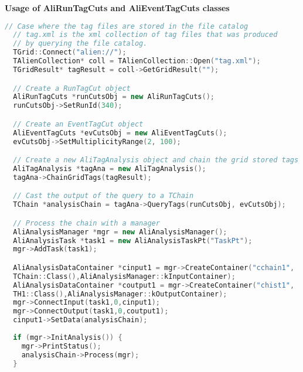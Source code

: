 \vspace{0.5 cm}
\textbf{Usage of AliRunTagCuts and AliEventTagCuts classes}
\begin{lstlisting}[language=C++]
  // Case where the tag files are stored in the file catalog
  // tag.xml is the xml collection of tag files that was produced 
  // by querying the file catalog.
  TGrid::Connect("alien://"); 
  TAlienCollection* coll = TAlienCollection::Open("tag.xml");
  TGridResult* tagResult = coll->GetGridResult("");

  // Create a RunTagCut object
  AliRunTagCuts *runCutsObj = new AliRunTagCuts();
  runCutsObj->SetRunId(340);

  // Create an EventTagCut object
  AliEventTagCuts *evCutsObj = new AliEventTagCuts();
  evCutsObj->SetMultiplicityRange(2, 100);

  // Create a new AliTagAnalysis object and chain the grid stored tags
  AliTagAnalysis *tagAna = new AliTagAnalysis(); 
  tagAna->ChainGridTags(tagResult);

  // Cast the output of the query to a TChain
  TChain *analysisChain = tagAna->QueryTags(runCutsObj, evCutsObj);

  // Process the chain with a manager
  AliAnalysisManager *mgr = new AliAnalysisManager();
  AliAnalysisTask *task1 = new AliAnalysisTaskPt("TaskPt");
  mgr->AddTask(task1);

  AliAnalysisDataContainer *cinput1 = mgr->CreateContainer("cchain1", 
  TChain::Class(),AliAnalysisManager::kInputContainer);
  AliAnalysisDataContainer *coutput1 = mgr->CreateContainer("chist1", 
  TH1::Class(),AliAnalysisManager::kOutputContainer);
  mgr->ConnectInput(task1,0,cinput1);
  mgr->ConnectOutput(task1,0,coutput1);
  cinput1->SetData(analysisChain);
  
  if (mgr->InitAnalysis()) {
    mgr->PrintStatus();
    analysisChain->Process(mgr);
  }
\end{lstlisting}

